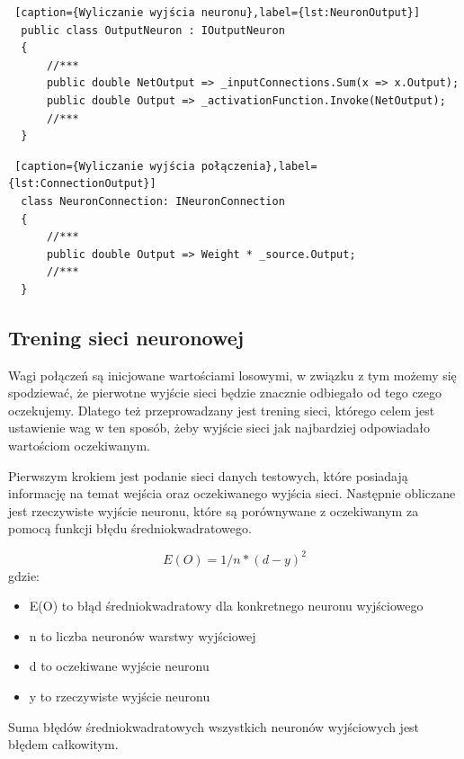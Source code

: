 \begin{lstlisting} [caption={Wyliczanie wyjścia neuronu},label={lst:NeuronOutput}]
  public class OutputNeuron : IOutputNeuron
  {
      //***
      public double NetOutput => _inputConnections.Sum(x => x.Output);
      public double Output => _activationFunction.Invoke(NetOutput);
      //***
  }
\end{lstlisting}


\begin{lstlisting} [caption={Wyliczanie wyjścia połączenia},label={lst:ConnectionOutput}]
  class NeuronConnection: INeuronConnection
  {
      //***
      public double Output => Weight * _source.Output;
      //***
  }
\end{lstlisting}

\subsection{Trening sieci neuronowej}
Wagi połączeń są inicjowane wartościami losowymi, w związku z tym możemy się spodziewać, że pierwotne wyjście sieci będzie znacznie odbiegało od tego czego oczekujemy.
Dlatego też przeprowadzany jest trening sieci, którego celem jest ustawienie wag w ten sposób, żeby wyjście sieci jak najbardziej odpowiadało wartościom oczekiwanym.

Pierwszym krokiem jest podanie sieci danych testowych, które posiadają informację na temat wejścia oraz oczekiwanego wyjścia sieci.
Następnie obliczane jest rzeczywiste wyjście neuronu, które są porównywane z oczekiwanym za pomocą funkcji błędu średniokwadratowego.

\[
    E(O)=1/n*(d-y)^2
\]
gdzie:
\begin{itemize}
  \item E(O) to błąd średniokwadratowy dla konkretnego neuronu wyjściowego
  \item n to liczba neuronów warstwy wyjściowej
  \item d to oczekiwane wyjście neuronu
  \item y to rzeczywiste wyjście neuronu
\end{itemize}

Suma błędów średniokwadratowych wszystkich neuronów wyjściowych jest błędem całkowitym.

